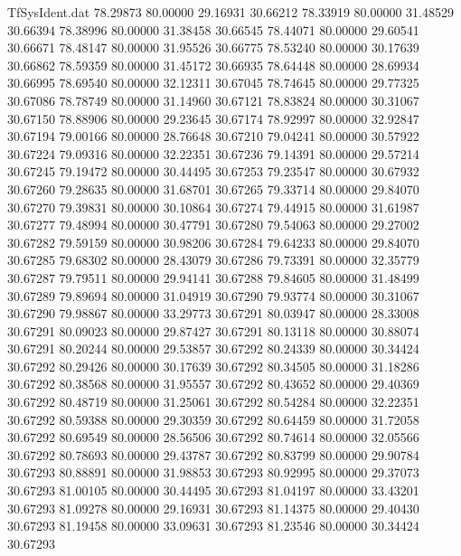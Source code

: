 \begin{filecontents}{TfSysIdent.dat}
  78.29873   80.00000   29.16931   30.66212
  78.33919   80.00000   31.48529   30.66394
  78.38996   80.00000   31.38458   30.66545
  78.44071   80.00000   29.60541   30.66671
  78.48147   80.00000   31.95526   30.66775
  78.53240   80.00000   30.17639   30.66862
  78.59359   80.00000   31.45172   30.66935
  78.64448   80.00000   28.69934   30.66995
  78.69540   80.00000   32.12311   30.67045
  78.74645   80.00000   29.77325   30.67086
  78.78749   80.00000   31.14960   30.67121
  78.83824   80.00000   30.31067   30.67150
  78.88906   80.00000   29.23645   30.67174
  78.92997   80.00000   32.92847   30.67194
  79.00166   80.00000   28.76648   30.67210
  79.04241   80.00000   30.57922   30.67224
  79.09316   80.00000   32.22351   30.67236
  79.14391   80.00000   29.57214   30.67245
  79.19472   80.00000   30.44495   30.67253
  79.23547   80.00000   30.67932   30.67260
  79.28635   80.00000   31.68701   30.67265
  79.33714   80.00000   29.84070   30.67270
  79.39831   80.00000   30.10864   30.67274
  79.44915   80.00000   31.61987   30.67277
  79.48994   80.00000   30.47791   30.67280
  79.54063   80.00000   29.27002   30.67282
  79.59159   80.00000   30.98206   30.67284
  79.64233   80.00000   29.84070   30.67285
  79.68302   80.00000   28.43079   30.67286
  79.73391   80.00000   32.35779   30.67287
  79.79511   80.00000   29.94141   30.67288
  79.84605   80.00000   31.48499   30.67289
  79.89694   80.00000   31.04919   30.67290
  79.93774   80.00000   30.31067   30.67290
  79.98867   80.00000   33.29773   30.67291
  80.03947   80.00000   28.33008   30.67291
  80.09023   80.00000   29.87427   30.67291
  80.13118   80.00000   30.88074   30.67291
  80.20244   80.00000   29.53857   30.67292
  80.24339   80.00000   30.34424   30.67292
  80.29426   80.00000   30.17639   30.67292
  80.34505   80.00000   31.18286   30.67292
  80.38568   80.00000   31.95557   30.67292
  80.43652   80.00000   29.40369   30.67292
  80.48719   80.00000   31.25061   30.67292
  80.54284   80.00000   32.22351   30.67292
  80.59388   80.00000   29.30359   30.67292
  80.64459   80.00000   31.72058   30.67292
  80.69549   80.00000   28.56506   30.67292
  80.74614   80.00000   32.05566   30.67292
  80.78693   80.00000   29.43787   30.67292
  80.83799   80.00000   29.90784   30.67293
  80.88891   80.00000   31.98853   30.67293
  80.92995   80.00000   29.37073   30.67293
  81.00105   80.00000   30.44495   30.67293
  81.04197   80.00000   33.43201   30.67293
  81.09278   80.00000   29.16931   30.67293
  81.14375   80.00000   29.40430   30.67293
  81.19458   80.00000   33.09631   30.67293
  81.23546   80.00000   30.34424   30.67293

\end{filecontents}
